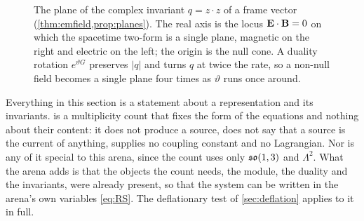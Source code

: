 \begin{figure}[t]
\centering
{}
\caption{The plane of the complex invariant $q=z\cdot z$ of a frame vector (\cref{thm:emfield,prop:planes}). The real axis is the
locus $\mathbf E\cdot\mathbf B=0$ on which the spacetime two-form is a single plane, magnetic on the right and electric on the left; the origin is
the null cone. A duality rotation $e^{\vartheta G}$ preserves $|q|$ and turns $q$ at twice the rate, so a non-null field becomes a single
plane four times as $\vartheta$ runs once around.}
\label{fig:qplane}
\end{figure}

Everything in this section is a statement about a representation and its invariants.  is a multiplicity count that
fixes the form of the equations and nothing about their content: it does not produce a source, does not say that a source is the
current of anything, supplies no coupling constant and no Lagrangian. Nor is any of it special to this arena, since the count uses only
$\mathfrak{so}(1,3)$ and $\Lambda^2$. What the arena adds is that the objects the count needs, the module, the duality and the invariants, were
already present, so that the system can be written in the arena's own variables \eqref{eq:RS}. The deflationary test of
\cref{sec:deflation} applies to it in full.
